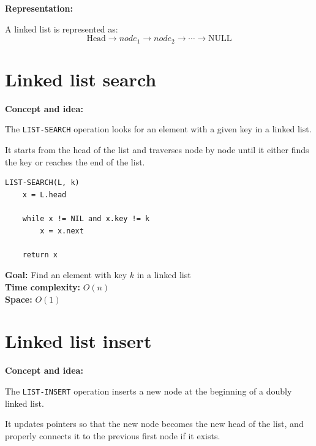 \documentclass[11pt,a4paper,openany]{book}
\begin{document}
\textbf{Representation:}

A linked list is represented as:
\[
\text{Head} \rightarrow node_1 \rightarrow node_2 \rightarrow \cdots \rightarrow \text{NULL}
\]












\vspace{2cm}






\section{Linked list search}
\textbf{Concept and idea:}

The \texttt{LIST-SEARCH} operation looks for an element with a given key in a linked list.

It starts from the head of the list and traverses node by node until it either finds the key or reaches the end of the list.

\begin{lstlisting}
LIST-SEARCH(L, k)
    x = L.head

    while x != NIL and x.key != k
        x = x.next

    return x
\end{lstlisting}

\textbf{Goal:} Find an element with key $k$ in a linked list \\

\textbf{Time complexity:} $O(n)$ \\

\textbf{Space:} $O(1)$








\vspace{2cm}






\section{Linked list insert}
\textbf{Concept and idea:}

The \texttt{LIST-INSERT} operation inserts a new node at the beginning of a doubly linked list.

It updates pointers so that the new node becomes the new head of the list, and properly connects it to the previous first node if it exists.
\end{document}

